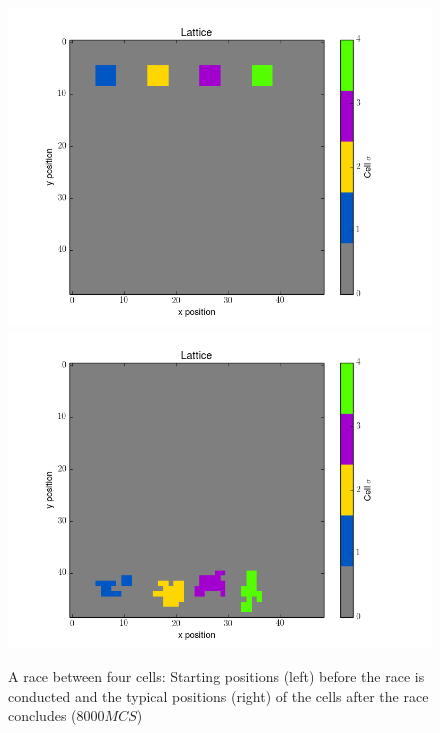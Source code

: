 \documentclass[12pt]{article}
\begin{document}
\begin{figure}[h]
	\centering
	\includegraphics[scale=0.40]{img/before_race_single}
	\includegraphics[scale=0.40]{img/after_race_single}
	\caption{A race between four cells: Starting positions (left) before the race is conducted and the typical positions (right) of the cells after the race concludes ($8000MCS$)}
	\label{single_race}
\end{figure}
\end{document}
